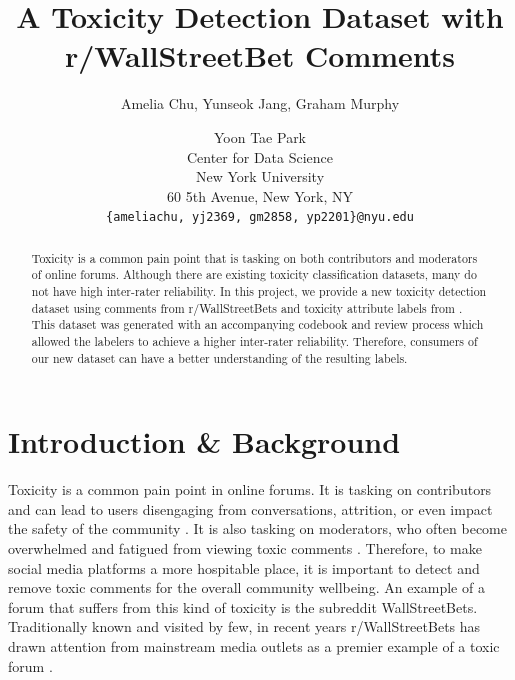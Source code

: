 \documentclass[11pt]{article}
\title{A Toxicity Detection Dataset with r/WallStreetBet Comments}
\author{Amelia Chu, Yunseok Jang, Graham Murphy \and Yoon Tae Park \\
 Center for Data Science \\ New York University \\ 60 5th Avenue, New York, NY \\
  \texttt{\{ameliachu, yj2369, gm2858, yp2201\}@nyu.edu} \\}
\begin{document}
\maketitle

\begin{abstract}
Toxicity is a common pain point that is tasking on both contributors and moderators of online forums. Although there are existing toxicity classification datasets, many do not have high inter-rater reliability. In this project, we provide a new toxicity detection dataset using comments from r/WallStreetBets and toxicity attribute labels from \citet{Perspective2022}. This dataset was generated with an accompanying codebook and review process which allowed the labelers to achieve a higher inter-rater reliability. Therefore, consumers of our new dataset can have a better understanding of the resulting labels.

\end{abstract}

\section{Introduction \& Background}
Toxicity is a common pain point in online forums. It is tasking on contributors and can lead to users disengaging from conversations, attrition, or even impact the safety of the community \citep{vidgen2021, salminen2020}. It is also tasking on moderators, who often become overwhelmed and fatigued from viewing toxic comments \citep{almerekhi2020, vidgen2020}.  Therefore, to make social media platforms a more hospitable place, it is important to detect and remove toxic comments for the overall community wellbeing.  An example of a forum that suffers from this kind of toxicity is the subreddit WallStreetBets. Traditionally known and visited by few, in recent years r/WallStreetBets has drawn attention from mainstream media outlets as a premier example of a toxic forum \citep{harwell2021, hadly2021, mccabe2021}. 
\end{document}
